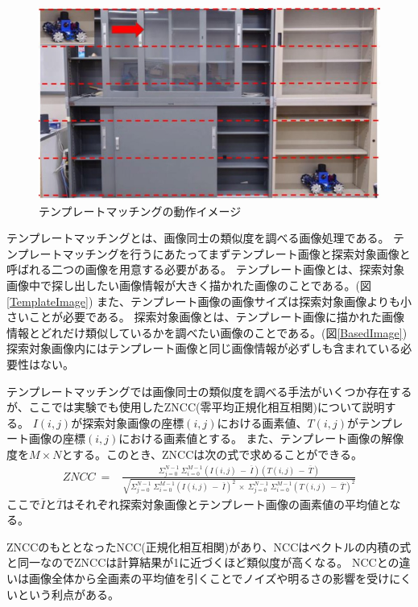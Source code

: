 \documentclass[titlepage,dvipdfmx]{jsarticle}
\begin{document}
\begin{figure}[t]
  \centering
  \includegraphics[pagebox=cropbox, scale=0.42]{TemplateMatching.jpeg}
  \caption{テンプレートマッチングの動作イメージ}
  \label{TemplateMatching}
\end{figure}


テンプレートマッチングとは、画像同士の類似度を調べる画像処理である。
テンプレートマッチングを行うにあたってまずテンプレート画像と探索対象画像と呼ばれる二つの画像を用意する必要がある。
テンプレート画像とは、探索対象画像中で探し出したい画像情報が大きく描かれた画像のことである。(図\ref{TemplateImage})
また、テンプレート画像の画像サイズは探索対象画像よりも小さいことが必要である。
探索対象画像とは、テンプレート画像に描かれた画像情報とどれだけ類似しているかを調べたい画像のことである。(図\ref{BasedImage})
探索対象画像内にはテンプレート画像と同じ画像情報が必ずしも含まれている必要性はない。

テンプレートマッチングでは画像同士の類似度を調べる手法がいくつか存在するが、ここでは実験でも使用したZNCC(零平均正規化相互相関)について説明する。
$I(i,j)$が探索対象画像の座標$(i,j)$における画素値、$T(i,j)$がテンプレート画像の座標$(i,j)$における画素値とする。
また、テンプレート画像の解像度を$M\times N$とする。このとき、ZNCCは次の式で求めることができる。
\begin{align}
  ZNCC \: = & \frac{\Sigma^{N-1}_{j=0}\:\Sigma^{M-1}_{i=0} \left(I(i,j)\:-\: \overline{I}\right) \left(T(i,j)\:-\:\overline{T}\right)}{\sqrt{\Sigma^{N-1}_{j=0}\:\Sigma^{M-1}_{i=0} \left(I(i,j)\:-\: \overline{I}\right)^2 \:\times\:\Sigma^{N-1}_{j=0}\:\Sigma^{M-1}_{i=0} \left(T(i,j)\:-\:\overline{T}\right)^2}}
\end{align}
ここで$\overline{I}$と$\overline{T}$はそれぞれ探索対象画像とテンプレート画像の画素値の平均値となる。

ZNCCのもととなったNCC(正規化相互相関)があり、NCCはベクトルの内積の式と同一なのでZNCCは計算結果が1に近づくほど類似度が高くなる。
NCCとの違いは画像全体から全画素の平均値を引くことでノイズや明るさの影響を受けにくいという利点がある。
\end{document}
